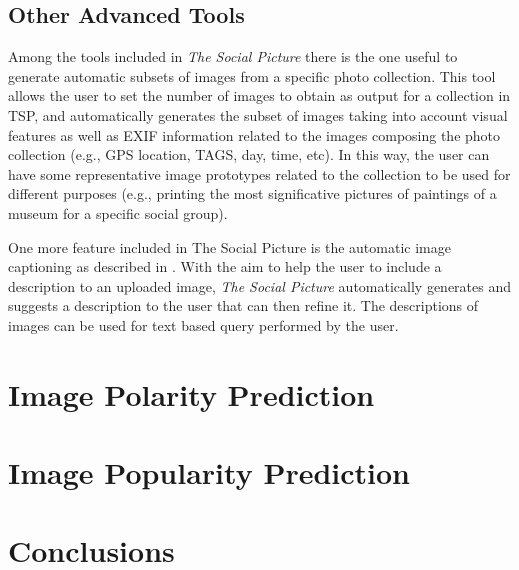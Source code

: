 \subsection{Other Advanced Tools}
%
Among the tools included in \textit{The Social Picture} there is the one useful to generate automatic subsets of images from a specific photo collection. This tool allows the user to set the number of images to obtain as output for a collection in TSP, and automatically generates the subset of images taking into account visual features as well as EXIF information related to the images composing the photo collection (e.g., GPS location, TAGS, day, time, etc). In this way, the user can have some representative image prototypes related to the collection to be used for different purposes (e.g., printing the most significative pictures of paintings of a museum for a specific social group).

One more feature included in The Social Picture is the automatic image captioning as described in \cite{Johnson2015densecap}. With the aim to help the user to include a description to an uploaded image, \textit{The Social Picture} automatically generates and suggests a description to the user that can then refine it.  The descriptions of images can be used for text based query performed by the user.


\section{Image Polarity Prediction}

\section{Image Popularity Prediction}

\section{Conclusions}
